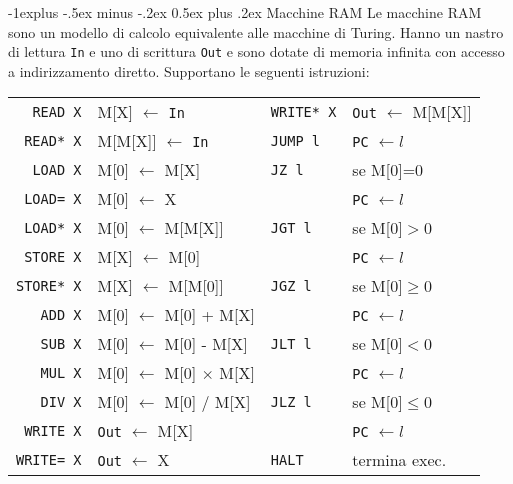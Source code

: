 \documentclass[10pt,landscape]{article}
\makeatletter
\renewcommand{\subsection}{\@startsection{subsection}{2}{0mm}%
                                {-1explus -.5ex minus -.2ex}%
                                {0.5ex plus .2ex}%
                                {\normalfont\large\bfseries}}
\makeatother
\begin{document}
\begin{multicols*}{4}
        \subsection{Macchine RAM}
        Le macchine RAM sono un modello di calcolo equivalente alle macchine di Turing. Hanno un nastro di lettura \texttt{In} e uno di scrittura \texttt{Out} e sono dotate di memoria infinita con accesso a indirizzamento diretto. Supportano le seguenti istruzioni:\\[3pt]
        \begin{tabular}{r l  l l}
                \verb|READ X|   & M[X] $\leftarrow$ \texttt{In}         & \verb|WRITE* X| & \texttt{Out} $\leftarrow$ M[M[X]] \\
                \verb|READ* X|  & M[M[X]]   $\leftarrow$ \texttt{In}    & \verb|JUMP l|   & \texttt{PC} $\leftarrow l$        \\
                \verb|LOAD X|   & M[0] $\leftarrow$ M[X]                & \verb|JZ l|     & se M[0]=0                         \\
                \verb|LOAD= X|  & M[0]   $\leftarrow$ X                 &                 & \texttt{PC} $\leftarrow l$        \\
                \verb|LOAD* X|  & M[0]   $\leftarrow$ M[M[X]]           & \verb|JGT l|    & se M[0]$>$0                       \\
                \verb|STORE X|  & M[X] $\leftarrow$ M[0]                &                 & \texttt{PC} $\leftarrow l$        \\
                \verb|STORE* X| & M[X]   $\leftarrow$ M[M[0]]           & \verb|JGZ l|    & se M[0]$\geq$0                    \\
                \verb|ADD X|    & M[0]  $\leftarrow$ M[0] + M[X]        &                 & \texttt{PC} $\leftarrow l$        \\
                \verb|SUB X|    & M[0]  $\leftarrow$ M[0] - M[X]        & \verb|JLT l|    & se M[0]$<$0                       \\
                \verb|MUL X|    & M[0]  $\leftarrow$ M[0] $\times$ M[X] &                 & \texttt{PC} $\leftarrow l$        \\
                \verb|DIV X|    & M[0]  $\leftarrow$ M[0] / M[X]        & \verb|JLZ l|    & se M[0]$\leq$0                    \\
                \verb|WRITE X|  & \texttt{Out} $\leftarrow$ M[X]        &                 & \texttt{PC} $\leftarrow l$        \\
                \verb|WRITE= X| & \texttt{Out} $\leftarrow$ X           & \verb|HALT|     & termina exec.                     \\
        \end{tabular}

\end{multicols*}
\end{document}
